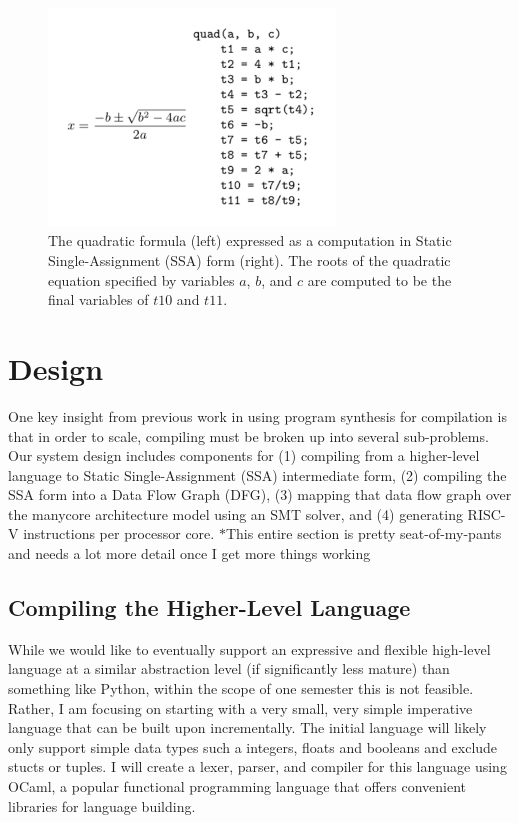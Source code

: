 \documentclass{sig-alternate-05-2015}
\newcommand{\note}{\color{red}$*$}
\begin{document}
\begin{figure}
    \centering
    \includegraphics[width=3in]{quadratic.png}
    \caption{The quadratic formula (left) expressed as a computation in Static Single-Assignment (SSA) form (right). The roots of the quadratic equation specified by variables $a$, $b$, and $c$ are computed to be the final variables of $t10$ and $t11$.}
    \label{fig:my_label}
\end{figure}

\section{Design}
One key insight from previous work in using program synthesis for compilation is that in order to scale, compiling must be broken up into several sub-problems. Our system design includes components for (1) compiling from a higher-level language to Static Single-Assignment (SSA) intermediate form, (2) compiling the SSA form into a Data Flow Graph (DFG), (3) mapping that data flow graph over the manycore architecture model using an SMT solver, and (4) generating RISC-V instructions per processor core. {\note This entire section is pretty seat-of-my-pants and needs a lot more detail once I get more things working}

\subsection{Compiling the Higher-Level Language}
While we would like to eventually support an expressive and flexible high-level language at a similar abstraction level (if significantly less mature) than something like Python, within the scope of one semester this is not feasible. Rather, I am focusing on starting with a very small, very simple imperative language that can be built upon incrementally. The initial language will likely only support simple data types such a integers, floats and booleans and exclude stucts or tuples. I will create a lexer, parser, and compiler for this language using OCaml, a popular functional programming language that offers convenient libraries for language building. 
\end{document}
